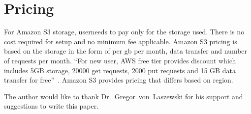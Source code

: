 \section{Pricing}

For Amazon S3 storage, user\GE needs to pay only for the storage
used. There is no cost required for setup and no minimum fee
applicable. Amazon S3 pricing is based on the storage in the form of
per gb per month, data transfer and number of requests per month.
``For new user, AWS free tier
provides discount which includes 5GB storage, 20000 get requests, 2000
put requests and 15 GB data transfer for
free''~\cite{hid-sp18-420-amazon-S3-pricing}. Amazon S3 provides
pricing that differs based on region.


\begin{acks}

  The author would like to thank Dr.~Gregor~von~Laszewski for his
  support and suggestions to write this paper.

\end{acks}


 
